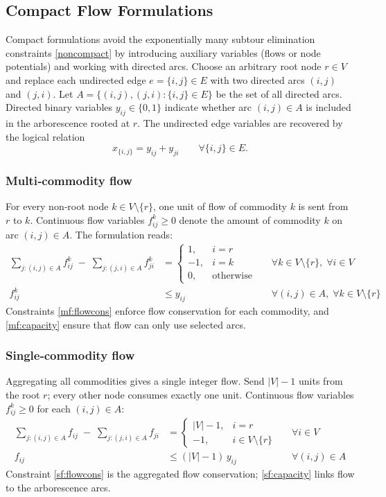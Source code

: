 \documentclass[12pt]{article}
\begin{document}
\subsection{Compact Flow Formulations}
Compact formulations avoid the exponentially many subtour elimination constraints \eqref{noncompact} by introducing auxiliary variables (flows or node potentials) and working with directed arcs.  
Choose an arbitrary root node $r \in V$ and replace each undirected edge $e = \{i,j\} \in E$ with two directed arcs $(i,j)$ and $(j,i)$.  
Let $A = \{ (i,j), (j,i) : \{i,j\} \in E \}$ be the set of all directed arcs.  
Directed binary variables $y_{ij} \in \{0,1\}$ indicate whether arc $(i,j) \in A$ is included in the arborescence rooted at $r$.  
The undirected edge variables are recovered by the logical relation
\[
x_{\{i,j\}} = y_{ij} + y_{ji} \qquad \forall \{i,j\}\in E.
\]

\subsubsection{Multi‑commodity flow} \label{sec:multi}
For every non‑root node $k \in V \setminus \{r\}$, one unit of flow of commodity $k$ is sent from $r$ to $k$.  
Continuous flow variables $f_{ij}^k \ge 0$ denote the amount of commodity $k$ on arc $(i,j)\in A$.  
The formulation reads:
\begin{align}
\sum_{j: (i,j) \in A} f_{ij}^k \;-\; \sum_{j: (j,i) \in A} f_{ji}^k &=
\begin{cases}
 1, & i = r \\
-1, & i = k \\
 0, & \text{otherwise}
\end{cases}
&& \forall k \in V\setminus\{r\},\; \forall i\in V \label{mf:flowcons} \\
f_{ij}^k &\le y_{ij}
&& \forall (i,j)\in A,\; \forall k\in V\setminus\{r\} \label{mf:capacity}
\end{align}
Constraints \eqref{mf:flowcons} enforce flow conservation for each commodity, and \eqref{mf:capacity} ensure that flow can only use selected arcs.

\subsubsection{Single‑commodity flow}\label{sec:integer}
Aggregating all commodities gives a single integer flow.  
Send $|V|-1$ units from the root $r$; every other node consumes exactly one unit.  
Continuous flow variables $f_{ij}^k \ge 0$ for each $(i,j)\in A$:
\begin{align}
\sum_{j: (i,j) \in A} f_{ij} \;-\; \sum_{j: (j,i) \in A} f_{ji} &=
\begin{cases}
|V|-1, & i = r \\
-1,    & i \in V\setminus\{r\}
\end{cases}
&& \forall i\in V \label{sf:flowcons} \\
f_{ij} &\le (|V|-1)\, y_{ij}
&& \forall (i,j)\in A \label{sf:capacity}
\end{align}
Constraint \eqref{sf:flowcons} is the aggregated flow conservation; \eqref{sf:capacity} links flow to the arborescence arcs.
\end{document}
